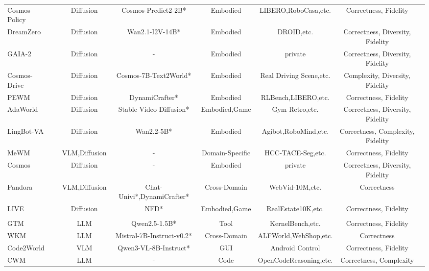 \documentclass{llmxive}
\providecommand{\Text}{
  \begin{tikzpicture}[baseline=(char.base)]
    \fill[textgreen!50] (0,0) circle (0.18);
    \node[white, font=\scriptsize\rmfamily, inner sep=0pt] (char) at (0,0) {T};
  \end{tikzpicture}
}
\providecommand{\Image}{
  \begin{tikzpicture}[baseline=(char.base)]
    \fill[textred!50] (0,0) circle (0.18);
    \node[white, font=\scriptsize\rmfamily, inner sep=0pt] (char) at (0,0) {I};
  \end{tikzpicture}
}
\providecommand{\Video}{
  \begin{tikzpicture}[baseline=(char.base)]
    \fill[textyellow!50] (0,0) circle (0.18);
    \node[white, font=\scriptsize\rmfamily, inner sep=0pt] (char) at (0,0) {V};
  \end{tikzpicture}
}
\begin{document}
\begin{table}
{\begin{tabular}{lccccccc}
 Cosmos Policy \cite{Cosmos_Policy} &\Video & Diffusion & Cosmos-Predict2-2B* &  Embodied & LIBERO,RoboCasa,etc. & Correctness, Fidelity \\
 DreamZero \cite{DreamZero} &\Video & Diffusion & Wan2.1-I2V-14B* &  Embodied & DROID,etc. & Correctness, Diversity, Fidelity\\
 GAIA-2 \cite{GAIA-2} &\Video & Diffusion & - & Embodied & private & Correctness, Diversity, Fidelity \\
 Cosmos-Drive \cite{Cosmos-Drive} &\Video & Diffusion & Cosmos-7B-Text2World* & Embodied & Real Driving Scene,etc. & Complexity, Diversity, Fidelity\\
 PEWM \cite{PEWM} &\Video & Diffusion & DynamiCrafter* & Embodied & RLBench,LIBERO,etc. & Correctness, Fidelity \\
 AdaWorld \cite{AdaWorld} &\Video & Diffusion & Stable Video Diffusion* & Embodied,Game & Gym Retro,etc. & Correctness, Diversity, Fidelity\\
 LingBot-VA \cite{LingBot-VA} &\Video & Diffusion & Wan2.2-5B* & Embodied & Agibot,RoboMind,etc. & Correctness, Complexity, Fidelity\\
 MeWM \cite{MeWM} &\Text\hspace{-0.4em}\Image & VLM,Diffusion & - & Domain-Specific & HCC-TACE-Seg,etc. & Correctness, Fidelity\\
 Cosmos \cite{Cosmos} &\Video & Diffusion & - & Embodied & private & Correctness, Diversity, Fidelity\\
 Pandora \cite{Pandora} &\Video & VLM,Diffusion & Chat-Univi*,DynamiCrafter* & Cross-Domain & WebVid-10M,etc. & Correctness\\
 LIVE \cite{LIVE} &\Video & Diffusion & NFD* & Embodied,Game & RealEstate10K,etc. & Correctness, Fidelity\\
 \midrule
\rowcolor{gray!10!white} \multicolumn{7}{c}{\textbf{\textit{Word-Level Modeling (\cref{sec:Word-level Modeling})}}}\\ 
 GTM \cite{GTM} &\Text & LLM & Qwen2.5-1.5B* &  Tool & KernelBench,etc. & Correctness, Fidelity \\
 WKM \cite{WKM} &\Text & LLM & Mistral-7B-Instruct-v0.2* &  Cross-Domain & ALFWorld,WebShop,etc. & Correctness \\
 Code2World \cite{Code2World} &\Text & VLM & Qwen3-VL-8B-Instruct* &  GUI & Android Control & Correctness, Fidelity \\
 CWM \cite{CWM} &\Text & LLM & - &  Code & OpenCodeReasoning,etc. & Correctness, Complexity \\

\end{tabular}}
\end{table}
\end{document}
